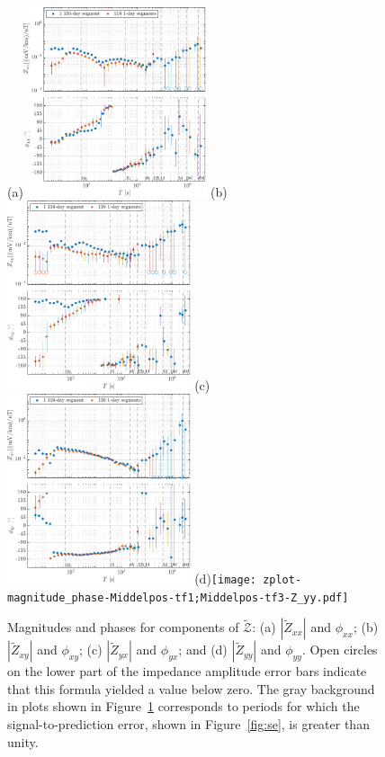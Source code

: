 \documentclass[draft,linenumbers]{agujournal2018}
\begin{document}
\begin{figure}[h!]
  \vspace{-2em}
  \subfigure(a){\includegraphics[width=0.48\textwidth]{figures/zplot-magnitude_phase-Middelpos-tf1;Middelpos-tf3-Z_xx.pdf}} 
  \subfigure(b){\includegraphics[width=0.48\textwidth]{figures/zplot-magnitude_phase-Middelpos-tf1;Middelpos-tf3-Z_xy.pdf}} 
  \subfigure(c){\includegraphics[width=0.48\textwidth]{figures/zplot-magnitude_phase-Middelpos-tf1;Middelpos-tf3-Z_yx.pdf}} 
  \subfigure(d){\texttt{[image: zplot-magnitude\_phase-Middelpos-tf1;Middelpos-tf3-Z\_yy.pdf]}} 

  \caption{Magnitudes and phases for components of $\boldsymbol{\mathcal{\widetilde{Z}}}$: (a) $|\widetilde{Z}_{xx}|$ and $\phi_{xx}$; (b) $|\widetilde{Z}_{xy}|$ and $\phi_{xy}$; (c) $|\widetilde{Z}_{yx}|$ and $\phi_{yx}$; and (d) $|\widetilde{Z}_{yy}|$ and $\phi_{yy}$. Open circles on the lower part of the impedance amplitude error bars indicate that this formula yielded a value below zero. The gray background in plots shown in Figure~\ref{fig:z} corresponds to periods for which the signal-to-prediction error, shown in Figure~\ref{fig:se}, is greater than unity.}
    \label{fig:z}


\end{figure}
\end{document}
